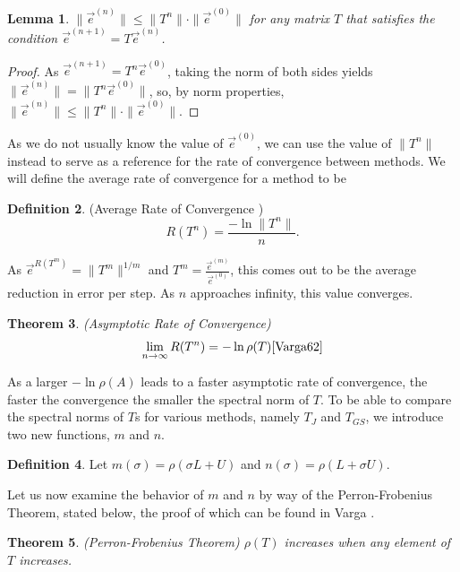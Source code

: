 \documentclass[12pt,letterpaper]{article}
\newtheorem{thm}{Theorem}[section]
\newtheorem{lem}[thm]{Lemma}
\theoremstyle{definition}
\newtheorem{defn}[thm]{Definition}
\begin{document}
\begin{lem}
$\|\vec{e}^{(n)}\|\leq\|T^n\|\cdot\|\vec{e}^{(0)}\|$ for any matrix $T$ that satisfies the condition $\vec{e}^{(n+1)}=T\vec{e}^{(n)}$.
\end{lem}
\begin{proof}
As $\vec{e}^{(n+1)}=T^n\vec{e}^{(0)}$, taking the norm of both sides yields $\|\vec{e}^{(n)}\|=\|T^n\vec{e}^{(0)}\|$, so, by norm properties, $\|\vec{e}^{(n)}\|\leq\|T^n\|\cdot\|\vec{e}^{(0)}\|$.
\end{proof}

As we do not usually know the value of $\vec{e}^{(0)}$, we can use the value of $\|T^n\|$ instead to serve as a reference for the rate of convergence between methods. We will define the average rate of convergence for a method to be 

\begin{defn}(Average Rate of Convergence \cite{Varga62})
\begin{equation}R(T^n)=\frac{-\ln\|T^n\|}{n}.\end{equation}
\end{defn}

As $\vec{e}^{R(T^m)}=\|T^m\|^{1/m}$ and $T^m=\frac{\vec{e}^{(m)}}{\vec{e}^{(0)}}$, this comes out to be the average reduction in error per step. As $n$ approaches infinity, this value converges. 

\begin{thm}(Asymptotic Rate of Convergence)
\begin{equation}\lim_{n\rightarrow\infty}R(T^n)=-\ln\rho(T)\cite{Varga62}\end{equation}
\end{thm}

As a larger $-\ln\rho(A)$ leads to a faster asymptotic rate of convergence, the faster the convergence the smaller the spectral norm of $T$. To be able to compare the spectral norms of $T$s for various methods, namely $T_J$ and $T_{GS}$, we introduce two new functions, $m$ and $n$. 

\begin{defn}
Let $m(\sigma)=\rho(\sigma L+U)$ and $n(\sigma)=\rho(L+\sigma U)$. 
\end{defn}

Let us now examine the behavior of $m$ and $n$ by way of the Perron-Frobenius Theorem, stated below, the proof of which can be found in Varga \cite{Varga62}.

\begin{thm}(Perron-Frobenius Theorem)
$\rho(T)$ increases when any element of $T$ increases.
\end{thm}
\end{document}
